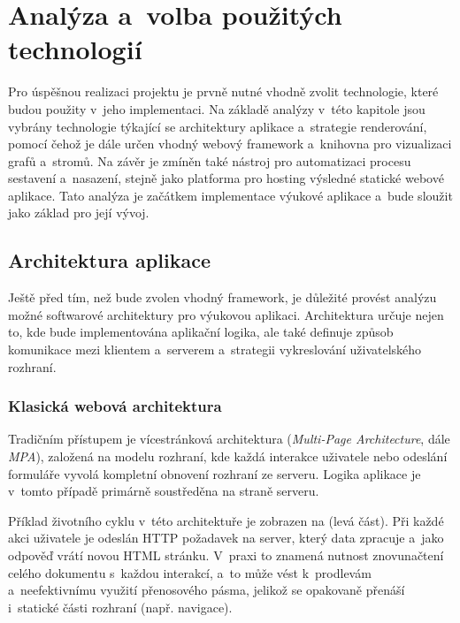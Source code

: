 \chapter{Analýza a~volba použitých technologií}
\label{chap:technologies}

Pro úspěšnou realizaci projektu je prvně nutné vhodně zvolit technologie, které budou použity v~jeho implementaci.
Na základě analýzy v~této kapitole jsou vybrány technologie týkající se architektury aplikace a~strategie renderování, pomocí čehož je dále určen vhodný webový framework a~knihovna pro vizualizaci grafů a~stromů.
Na závěr je zmíněn také nástroj pro automatizaci procesu sestavení a~nasazení, stejně jako platforma pro hosting výsledné statické webové aplikace.
Tato analýza je začátkem implementace výukové aplikace a~bude sloužit jako základ pro její vývoj.

\section{Architektura aplikace}
\label{sec:app_architecture}

Ještě před tím, než bude zvolen vhodný framework, je důležité provést analýzu možné softwarové architektury pro výukovou aplikaci.
Architektura určuje nejen to, kde bude implementována aplikační logika, ale také definuje způsob komunikace mezi klientem a~serverem a~strategii vykreslování uživatelského rozhraní.

\subsection{Klasická webová architektura}
\label{subsec:client_server_architecture}

Tradičním přístupem je vícestránková architektura (\textit{Multi-Page Architecture}, dále \textit{MPA}), založená na modelu rozhraní, kde každá interakce uživatele nebo odeslání formuláře vyvolá kompletní obnovení rozhraní ze serveru.
Logika aplikace je v~tomto případě primárně soustředěna na straně serveru.~\cite{joseph2015}

Příklad životního cyklu v~této architektuře je zobrazen na  (levá část).
Při každé akci uživatele je odeslán HTTP požadavek na server, který data zpracuje a~jako odpověď vrátí novou HTML stránku.
V~praxi to znamená nutnost znovunačtení celého dokumentu s~každou interakcí, a~to může vést k~prodlevám a~neefektivnímu využití přenosového pásma, jelikož se opakovaně přenáší i~statické části rozhraní (např. navigace).

